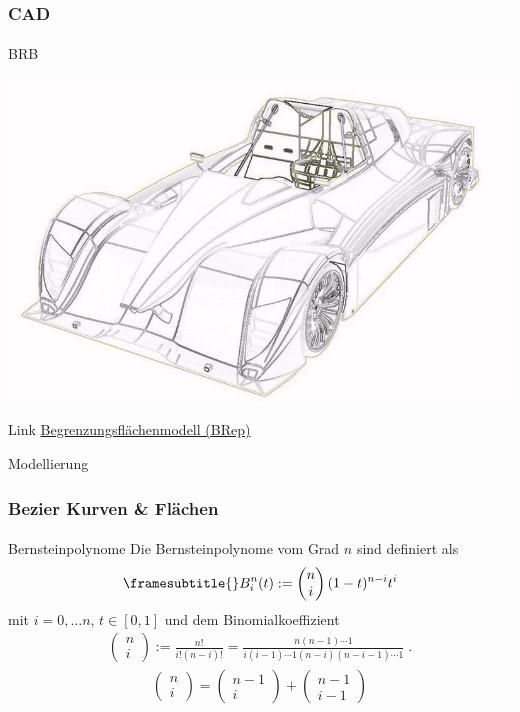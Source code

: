 \documentclass{beamer}
\begin{document}
\begin{frame}
    \frametitle{CAD}
\framesubtitle{}
    \begin{block}{BRB}
\begin{center}
\includegraphics[scale=0.85]{images/brb}
\end{center}
\end{block}

\begin{block}{Link}
\href{https://de.wikipedia.org/wiki/Boundary_Representation}{Begrenzungsflächenmodell (BRep)}
\end{block}

\end{frame}






\begin{frame}{Modellierung}
\frametitle{Bezier Kurven & Flächen}
\framesubtitle{}
 \begin{block}{Bernsteinpolynome}
Die Bernsteinpolynome vom Grad $n$ sind definiert als
\begin{align*}
\framesubtitle{}
B_i^n(t) := \begin{pmatrix} n \\ i \end{pmatrix} (1-t)^{n-i}t^i
\end{align*}
mit $i = 0, \hdots n$, $t \in [0,1]$ und dem Binomialkoeffizient
\begin{align*}
\begin{pmatrix} n \\ i \end{pmatrix} := \frac{n!}{i!(n-i)!} = \frac{n(n-1) \cdots 1}{i(i-1) \cdots 1 (n-i) (n-i-1) \cdots 1 } \; .
\end{align*}
\begin{align*}
\begin{pmatrix} n \\ i \end{pmatrix} = \begin{pmatrix} n-1 \\ i \end{pmatrix} + \begin{pmatrix} n-1 \\ i-1 \end{pmatrix} 
\end{align*}
\end{block}
\end{frame}
\end{document}
